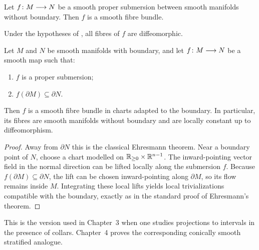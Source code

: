 \begin{proposition}\label{ap:: prop: Ehresmann fibration no boundary}
    Let $f\colon M \longrightarrow N$ be a smooth proper submersion between smooth manifolds without boundary. Then $f$ is a smooth fibre bundle.
\end{proposition}

\begin{cor}
    Under the hypotheses of , all fibres of $f$ are diffeomorphic.
\end{cor}

\begin{proposition}\label{ap:: prop: ehresmann boundary}
    Let $M$ and $N$ be smooth manifolds with boundary, and let $f\colon M \longrightarrow N$ be a smooth map such that:
    \begin{enumerate}
        \item $f$ is a proper submersion;
        \item $f(\partial M)\subseteq \partial N$.
    \end{enumerate}
    Then $f$ is a smooth fibre bundle in charts adapted to the boundary. In particular, its fibres are smooth manifolds without boundary and are locally constant up to diffeomorphism.
\end{proposition}
\begin{proof}
    Away from $\partial N$ this is the classical Ehresmann theorem. Near a boundary point of $N$, choose a chart modelled on $\mathbb R_{\geq 0}\times \mathbb R^{n-1}$. The inward-pointing vector field in the normal direction can be lifted locally along the submersion $f$. Because $f(\partial M)\subseteq \partial N$, the lift can be chosen inward-pointing along $\partial M$, so its flow remains inside $M$. Integrating these local lifts yields local trivializations compatible with the boundary, exactly as in the standard proof of Ehresmann's theorem.
\end{proof}

\begin{remark}
    This is the version used in Chapter~3 when one studies projections to intervals in the presence of collars. Chapter~4 proves the corresponding conically smooth stratified analogue.
\end{remark}
